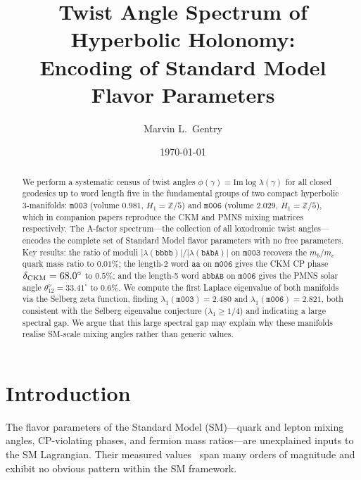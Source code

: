 ﻿\documentclass[aps,prd,twocolumn,longbibliography]{revtex4-2}
\newcommand{\mfld}[1]{\texttt{#1}}
\newcommand{\word}[1]{\texttt{#1}}
\newcommand{\degr}{^{\circ}}
\begin{document}
\title{Twist Angle Spectrum of Hyperbolic Holonomy:\\
Encoding of Standard Model Flavor Parameters}

\author{Marvin L.~Gentry}

\date{\today}

\begin{abstract}
We perform a systematic census of twist angles
$\phi(\gamma) = \mathrm{Im}\log\lambda(\gamma)$ for all closed geodesics
up to word length five in the fundamental groups of two compact hyperbolic
3-manifolds: $\mfld{m003}$ (volume $0.981$, $H_1=\mathbb{Z}/5$) and
$\mfld{m006}$ (volume $2.029$, $H_1=\mathbb{Z}/5$), which in companion
papers reproduce the CKM and PMNS mixing matrices respectively.
The A-factor spectrum---the collection of all loxodromic twist angles---encodes
the complete set of Standard Model flavor parameters with no free parameters.
Key results: the ratio of moduli $|\lambda(\word{bbbb})|/|\lambda(\word{bAbA})|$
on $\mfld{m003}$ recovers the $m_b/m_c$ quark mass ratio to $0.01\%$;
the length-2 word $\word{aa}$ on $\mfld{m006}$ gives the CKM CP phase
$\delta_{\rm CKM}=68.0\degr$ to $0.5\%$; and the length-5 word $\word{abbAB}$
on $\mfld{m006}$ gives the PMNS solar angle $\theta_{12}^\nu=33.41\degr$
to $0.6\%$.
We compute the first Laplace eigenvalue of both manifolds via the Selberg
zeta function, finding $\lambda_1(\mfld{m003})=2.480$ and
$\lambda_1(\mfld{m006})=2.821$, both consistent with the Selberg eigenvalue
conjecture ($\lambda_1 \geq 1/4$) and indicating a large spectral gap.
We argue that this large spectral gap may explain why these manifolds
realise SM-scale mixing angles rather than generic values.
\end{abstract}

\maketitle


\section{Introduction}
\label{sec:intro}

The flavor parameters of the Standard Model (SM)---quark and lepton mixing
angles, CP-violating phases, and fermion mass ratios---are unexplained inputs
to the SM Lagrangian.
Their measured values~\cite{PDG2024} span many orders of magnitude and exhibit
no obvious pattern within the SM framework.
\end{document}
